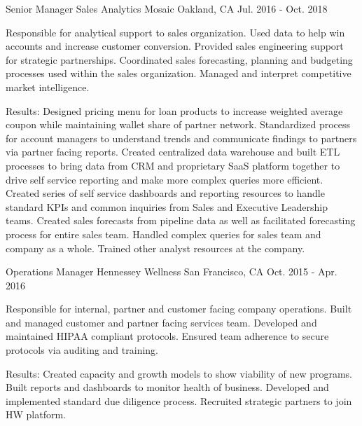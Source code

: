 \begin{cventries}
\cventry
{Senior Manager Sales Analytics} %
{Mosaic} %
{Oakland, CA} %
{Jul. 2016 - Oct. 2018} %
{ %
\begin{cvitems}
\item {Responsible for analytical support to sales organization. Used data to help win accounts and increase customer conversion. Provided sales engineering support for strategic partnerships. Coordinated sales forecasting, planning and budgeting processes used within the sales organization. Managed and interpret competitive market intelligence.}
\end{cvitems}
}
\begin{cvitemsnb}
\item {Results: Designed pricing menu for loan products to increase weighted average coupon while maintaining wallet share of partner network. Standardized process for account managers to understand trends and communicate findings to partners via partner facing reports. Created centralized data warehouse and built ETL processes to bring data from CRM and proprietary SaaS platform together to drive self service reporting and make more complex queries more efficient. Created series of self service dashboards and reporting resources to handle standard KPIs and common inquiries from Sales and Executive Leadership teams. Created sales forecasts from pipeline data as well as facilitated forecasting process for entire sales team. Handled complex queries for sales team and company as a whole. Trained other analyst resources at the company.}
\end{cvitemsnb}
	

\cventry
{Operations Manager} %
{Hennessey Wellness} %
{San Francisco, CA} %
{Oct. 2015 - Apr. 2016} %
{ %
\begin{cvitems}
\item {Responsible for internal, partner and customer facing company operations. Built and managed customer and partner facing services team. Developed and maintained HIPAA compliant protocols. Ensured team adherence to secure protocols via auditing and training.}
\end{cvitems}
}
\begin{cvitemsnb}
\item {Results: Created capacity and growth models to show viability of new programs. Built reports and dashboards to monitor health of business. Developed and implemented standard due diligence process. Recruited strategic partners to join HW platform.}
\end{cvitemsnb}


\end{cventries}
